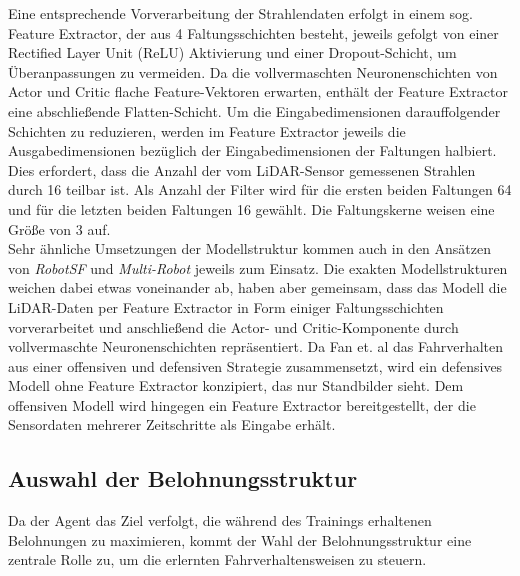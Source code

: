 Eine entsprechende
Vorverarbeitung der Strahlendaten erfolgt in einem sog. Feature Extractor, der aus
4 Faltungsschichten besteht, jeweils gefolgt von einer Rectified Layer Unit (ReLU)
Aktivierung und einer Dropout-Schicht, um Überanpassungen zu vermeiden.
Da die vollvermaschten Neuronenschichten von Actor und Critic flache Feature-Vektoren
erwarten, enthält der Feature Extractor eine abschließende Flatten-Schicht.
Um die Eingabedimensionen darauffolgender Schichten zu reduzieren, werden im Feature
Extractor jeweils die Ausgabedimensionen bezüglich der Eingabedimensionen der Faltungen
halbiert. Dies erfordert, dass die Anzahl der vom LiDAR-Sensor gemessenen Strahlen
durch 16 teilbar ist. Als Anzahl der Filter wird für die ersten beiden Faltungen 64
und für die letzten beiden Faltungen 16 gewählt. Die Faltungskerne weisen eine Größe
von 3 auf.\\

Sehr ähnliche Umsetzungen der Modellstruktur kommen auch in den Ansätzen von
\emph{RobotSF} und \emph{Multi-Robot} jeweils zum Einsatz. Die exakten Modellstrukturen
weichen dabei etwas voneinander ab, haben aber gemeinsam, dass das Modell die LiDAR-Daten
per Feature Extractor in Form einiger Faltungsschichten vorverarbeitet und anschließend
die Actor- und Critic-Komponente durch vollvermaschte Neuronenschichten repräsentiert.
Da Fan et. al \cite{fan2020distributed} das Fahrverhalten aus einer offensiven und
defensiven Strategie zusammensetzt, wird ein defensives Modell ohne Feature Extractor
konzipiert, das nur Standbilder sieht. Dem offensiven Modell wird hingegen ein Feature
Extractor bereitgestellt, der die Sensordaten mehrerer Zeitschritte als Eingabe erhält.

\subsection{Auswahl der Belohnungsstruktur} \label{sec:Reward}
Da der Agent das Ziel verfolgt, die während des Trainings erhaltenen Belohnungen
zu maximieren, kommt der Wahl der Belohnungsstruktur eine zentrale Rolle zu,
um die erlernten Fahrverhaltensweisen zu steuern.\\

